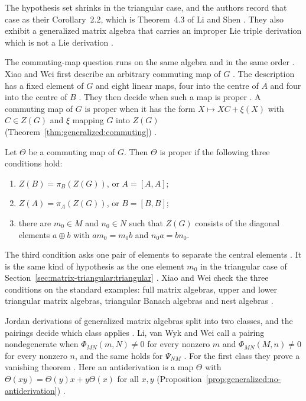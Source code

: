 The hypothesis set shrinks in the triangular case, and the authors record that
case as their Corollary~2.2, which is Theorem~4.3 of Li and Shen
\cite[Corollary~2.2, p.~3659]{AshrafAkhtar2020}. They also exhibit a generalized
matrix algebra that carries an improper Lie triple derivation which is not a Lie
derivation \cite[Example~2.1, pp.~3658--3659]{AshrafAkhtar2020}.

The commuting-map question runs on the same algebra and in the same order
\cite[p.~2178]{XiaoWei2010}. Xiao and Wei first describe an arbitrary commuting
map of $G$ \cite[Proposition~3.3, p.~2185]{XiaoWei2010}. The description has a
fixed element of $G$ and eight linear maps, four into the centre of $A$ and four
into the centre of $B$ \cite[p.~2185]{XiaoWei2010}. They then decide when such a
map is proper \cite[Proposition~3.5, p.~2189]{XiaoWei2010}. A commuting map of $G$
is proper when it has the form $X\mapsto XC+\xi(X)$ with $C\in Z(G)$ and $\xi$
mapping $G$ into $Z(G)$ (Theorem~\ref{thm:generalized:commuting}) \cite[p.~2184]{XiaoWei2010}.

\begin{theorem}\label{thm:generalized:commuting}
Let $\Theta$ be a commuting map of $G$. Then $\Theta$ is proper if the following
three conditions hold:
\begin{enumerate}
\item $Z(B)=\pi_B(Z(G))$, or $A=[A,A]$;
\item $Z(A)=\pi_A(Z(G))$, or $B=[B,B]$;
\item there are $m_0\in M$ and $n_0\in N$ such that $Z(G)$ consists of the
diagonal elements $a\oplus b$ with $am_0=m_0b$ and $n_0a=bn_0$.
\end{enumerate}
\end{theorem}

The third condition asks one pair of elements to separate the central elements
\cite[p.~2192]{XiaoWei2010}. It is the same kind of hypothesis as the one element
$m_0$ in the triangular case of Section~\ref{sec:matrix-triangular:triangular}
\cite[Theorem~2, p.~124]{Cheung2001}. Xiao and Wei check the three conditions on
the standard examples: full matrix algebras, upper and lower triangular matrix
algebras, triangular Banach algebras and nest algebras
\cite[Section~2, pp.~2182--2184]{XiaoWei2010}.

Jordan derivations of generalized matrix algebras split into two classes, and the
pairings decide which class applies \cite[p.~13]{LiVanWykWei2012}. Li, van Wyk and
Wei call a pairing nondegenerate when $\Phi_{MN}(m,N)\neq0$ for every nonzero
$m$ and $\Phi_{MN}(M,n)\neq0$ for every nonzero $n$, and the same holds for
$\Psi_{NM}$ \cite[Definition~3.7, p.~12]{LiVanWykWei2012}. For the first class
they prove a vanishing theorem \cite[Proposition~3.10, p.~13]{LiVanWykWei2012}. Here an
antiderivation is a map $\Theta$ with $\Theta(xy)=\Theta(y)x+y\Theta(x)$ for all
$x,y$ (Proposition~\ref{prop:generalized:no-antiderivation}) \cite[p.~2]{LiVanWykWei2012}.

